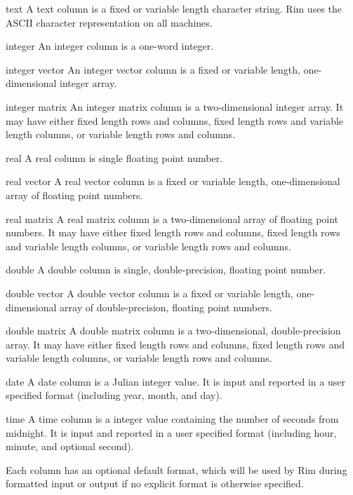 \documentclass[11pt,a4paper]{report}
\begin{document}
\begin{List}
\item[text] A text column is a fixed or variable length
   character string.  Rim uses the ASCII character representation
   on all machines.
\item[integer] An integer column is a one-word integer.
\item[integer vector] An integer vector column is
   a fixed or variable length, one-dimensional integer array.
\item[integer matrix] An integer matrix column is
   a two-dimensional integer array.  It may have either
   fixed length rows and columns, fixed length rows and variable
   length columns, or variable length rows and columns.
\item[real] A real column is single
   floating point number.
\item[real vector] A real vector column is
   a fixed or variable length, one-di\-men\-sional
   array of floating point numbers.
\item[real matrix] A real matrix column is
   a two-dimensional array of floating point numbers.
   It may have either
   fixed length rows and columns, fixed length rows and variable
   length columns, or variable length rows and columns.
\item[double] A double column is single,
   double-precision, floating point number.
\item[double vector] A double vector column is
   a fixed or variable length, one-dimensional array of
   double-precision, floating point numbers.
\item[double matrix] A double matrix column is
   a two-dimensional, double-precision array.  It may have either
   fixed length rows and columns, fixed length rows and variable
   length columns, or variable length rows and columns.
\item[date] A date column is a Julian integer value.
   It is input and reported in a user specified format
   (including year, month, and day).
\item[time] A time column is a integer value containing
   the number of seconds from midnight.
   It is input and reported in a user specified format
   (including hour, minute, and optional second).
\end{List}
 
Each column has an optional default format, which will be used
by Rim during formatted input or output if no explicit
format is otherwise specified.
 
\end{document}
